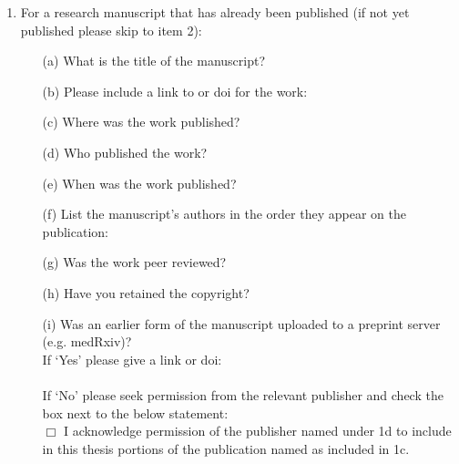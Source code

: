 \begin{enumerate}
    \item For a research manuscript that has already been published (if not yet published please skip to item 2):
    \begin{enumerate}
        \item[(a)] What is the title of the manuscript?\\
        \TextField{}
        \item[(b)] Please include a link to or doi for the work:\\
        \TextField{}
        \item[(c)] Where was the work published?\\
        \TextField{}
        \item[(d)] Who published the work?\\
        \TextField{}
        \item[(e)] When was the work published?\\
        \TextField{}
        \item[(f)] List the manuscript’s authors in the order they appear on the publication:\\
        \TextField{}
        \item[(g)] Was the work peer reviewed?\\
        \CheckBox{}
        \item[(h)] Have you retained the copyright?\\
        \CheckBox{}
        \item[(i)] Was an earlier form of the manuscript uploaded to a preprint server (e.g. medRxiv)?\\
        
         If ‘Yes’ please give a link or doi:\\
        \TextField{}\\
        
        If ‘No’ please seek permission from the relevant publisher and check the box next to the below statement:\\
	$\Box$ I acknowledge permission of the publisher named under 1d to include in this thesis portions of the publication named as included in 1c.
    \end{enumerate}
    


\end{enumerate}
